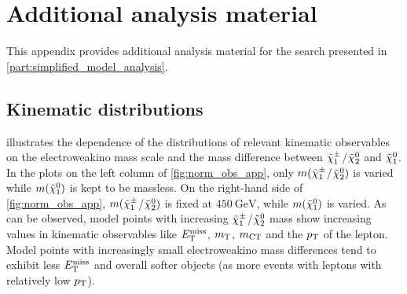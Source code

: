 
\chapter{Additional analysis material}

\graphicspath{{chapter-analysis/Figs/}}

This appendix provides additional analysis material for the \onelepton search presented in \cref{part:simplified_model_analysis}.

\section{Kinematic distributions}\label{app:kinematic_distributions}

 illustrates the dependence of the distributions of relevant kinematic observables on the electroweakino mass scale and the mass difference between $\tilde{\chi}_1^\pm$/$\tilde{\chi}_2^0$ and $\tilde{\chi}_1^0$. In the plots on the left column of \cref{fig:norm_obs_app}, only \mbox{$m(\tilde{\chi}_1^\pm$/$\tilde{\chi}_2^0)$} is varied while $m(\tilde{\chi}_1^0)$ is kept to be massless. On the right-hand side of \cref{fig:norm_obs_app}, \mbox{$m(\tilde{\chi}_1^\pm$/$\tilde{\chi}_2^0)$} is fixed at $\SI{450}{\GeV}$, while $m(\tilde{\chi}_1^0)$ is varied. As can be observed, model points with increasing \mbox{$\tilde{\chi}_1^\pm$/$\tilde{\chi}_2^0$} mass show increasing values in kinematic observables like $E_{\textrm{T}}^{\textrm{miss}}$, $m_{\textrm{T}}$, $m_{\textrm{CT}}$ and the $p_{\mathrm{T}}$ of the lepton. Model points with increasingly small electroweakino mass differences tend to exhibit less $E_{\textrm{T}}^{\textrm{miss}}$ and overall softer objects (as \eg more events with leptons with relatively low $p_{\mathrm{T}}$).

